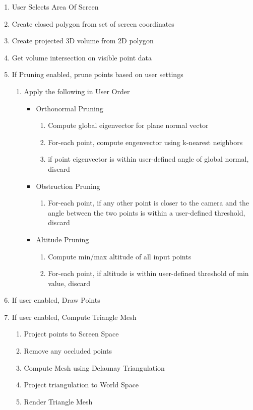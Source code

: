 \begin{enumerate}
  \item User Selects Area Of Screen
  \item Create closed polygon from set of screen coordinates
  \item Create projected 3D volume from 2D polygon
  \item Get volume intersection on visible point data
  \item If Pruning enabled, prune points based on user settings
  \begin{enumerate}
    \item Apply the following in User Order
    \begin{itemize}
      \item Orthonormal Pruning
      \begin{enumerate}
        \item Compute global eigenvector for plane normal vector
        \item For-each point, compute engenvector using k-nearest neighbors
        \item if point eigenvector is within user-defined angle of global normal, discard
      \end{enumerate}
      \item Obstruction Pruning
      \begin{enumerate}
        \item For-each point, if any other point is closer to the camera and the angle between the two points is within a user-defined threshold, discard
      \end{enumerate}
      \item Altitude Pruning
      \begin{enumerate}
        \item Compute min/max altitude of all input points
        \item For-each point, if altitude is within user-defined threshold of min value, discard
      \end{enumerate}
    \end{itemize}
  \end{enumerate}
  \item If user enabled, Draw Points
  \item If user enabled, Compute Triangle Mesh
    \begin{enumerate}
      \item Project points to Screen Space
      \item Remove any occluded points
      \item Compute Mesh using Delaunay Triangulation
      \item Project triangulation to World Space
      \item Render Triangle Mesh
    \end{enumerate}
\end{enumerate}

